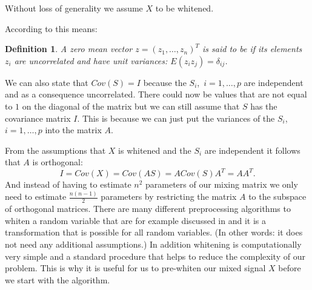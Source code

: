 \documentclass[12pt, a4paper]{article}
\newtheorem{Definition}[Theorem]{Definition}
\numberwithin{equation}{section}
\numberwithin{figure}{section}
\numberwithin{table}{section}
\begin{document}
	Without loss of generality we assume $X$ to be whitened.
	
	According to \citet{ICA_Book} this means:
	
	\begin{Definition}
		A zero mean vector $z=(z_1,\dots,z_n)^T$ is said to be  \textit{if its elements $z_i$ are uncorrelated and have unit variances: $E(z_iz_j)=\delta_{ij}$.}
	\end{Definition}
	
	We can also state that \mbox{$Cov(S)=I$} because the \mbox{$S_i$, $ i=1,\dots,p$} are independent and as a consequence uncorrelated. %
	There could now be values that are not equal to $1$ on the diagonal of the matrix but we can still assume that $S$ has the covariance matrix $I$.
	This is because we can just put the variances of the \mbox{$S_i$, $i=1,\dots,p$} into the matrix $A$. %
	
	From the assumptions that $X$ is whitened and the $S_i$ are independent it follows that $A$ is orthogonal:
	\begin{equation}\label{orthogonality}
	I=Cov(X)=Cov(AS)=ACov(S)A^T=AA^T.
	\end{equation}
	And instead of having to estimate $n^2$ parameters of our mixing matrix we only need to estimate \mbox{$\frac{n(n-1)}{2}$} parameters by restricting the matrix $A$ to the subspace of orthogonal matrices. %
	There are many different preprocessing algorithms to whiten a random variable that are for example discussed in \citet{ICA_Book}
	and it is a transformation that is possible for all random variables. (In other words: it does not need any additional assumptions.)
	In addition whitening is computationally very simple and a standard procedure that helps to reduce the complexity of our problem.
	This is why it is useful for us to pre-whiten our mixed signal $X$ before we start with the algorithm.
	
	
\end{document}
